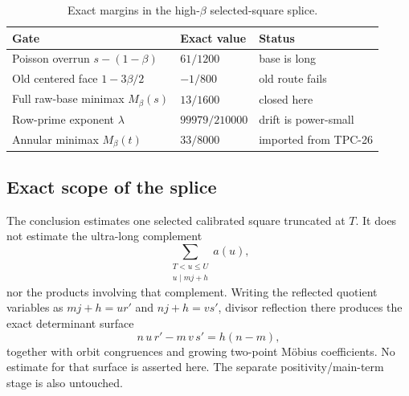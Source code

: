 \begin{table}[t]
\centering
\caption{Exact margins in the high-\(\beta\) selected-square splice.}
\label{tab:tpc28-high-ledger}
\begin{tabular}{@{}lll@{}}
\toprule
Gate & Exact value & Status \\
\midrule
Poisson overrun $s-(1-\beta)$ & $61/1200$ & base is long \\
Old centered face $1-3\beta/2$ & $-1/800$ & old route fails \\
Full raw-base minimax $M_\beta(s)$ & $13/1600$ & closed here \\
Row-prime exponent $\lambda$ & $99979/210000$ & drift is power-small \\
Annular minimax $M_\beta(t)$ & $33/8000$ & imported from TPC-26 \\
\bottomrule
\end{tabular}
\end{table}

\subsection{Exact scope of the splice}

The conclusion estimates one selected calibrated square truncated at
$T$.  It does not estimate the ultra-long complement
\begin{equation}
 \sum_{\substack{T<u\le U\\u\mid mj+h}}a(u),
 \label{eq:tpc28-ultra-long-complement}
\end{equation}
nor the products involving that complement.  Writing the reflected
quotient variables as
$mj+h=ur'$ and $nj+h=vs'$, divisor reflection there produces the
exact determinant surface
\begin{equation}
 n\,u\,r'-m\,v\,s'=h(n-m),
 \label{eq:tpc28-reflected-surface}
\end{equation}
together with orbit congruences and growing two-point M\"obius
coefficients.  No estimate for that surface is asserted here.  The
separate positivity/main-term stage is also untouched.
